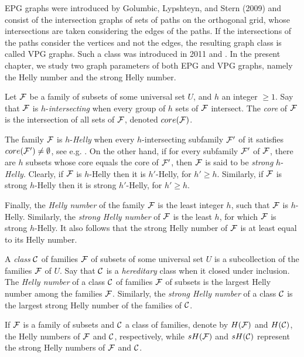 EPG graphs were introduced by Golumbic, Lypshteyn, and Stern (2009) and consist of the intersection graphs of sets of paths on the orthogonal grid, whose intersections are taken considering the edges of the paths. If the intersections of the paths consider the vertices and not the edges, the resulting graph class is called VPG graphs. Such a class was introduced in 2011 \cite{asinowski2011string} and \cite{asinowski2012}.  In the present chapter, we study two graph parameters of both EPG and VPG graphs, namely the Helly number and the strong Helly number.

Let $\cal {F}$ be a family of subsets of some universal set $U$, and $h$ an integer $\geq 1$.  Say that $\cal{F}$ is $h$-{\it intersecting} when every group of $h$ sets of $\cal {F}$ intersect. The {\it core} of $\cal {F}$ is the intersection of all sets of $\cal {F}$, denoted $core(\cal F)$. 

The family $\cal{F}$ is $h$-{\it Helly}  when every $h$-intersecting subfamily $\cal{F'}$ of it satisfies $core(\cal{F'}) \neq \emptyset$, see e.g. \cite{duchet1978propriete}. On the other hand, if for every subfamily $\cal{F'}$ of $\cal{F}$, there are $h$ subsets whose core equals the core of  $\cal {F'}$, then $\cal {F}$ is said to be {\it strong} $h$-{\it Helly}. Clearly, if $\cal {F}$ is $h$-Helly then it is $h'$-Helly, for $h' \geq h$. Similarly, 
 if ${\cal F}$ is strong $h$-Helly then it is strong $h'$-Helly, for $h' \geq h$. 

Finally, the  {\it Helly number} of the family $\cal{F}$ is the least integer $h$, such that $\cal{F}$ is $h$-Helly. Similarly, the {\it strong Helly number} of $\cal{F}$ is the least $h$, for which  $\cal{F}$ is strong $h$-Helly. It also follows that the strong Helly number of $\cal{F}$ is at least equal to its  Helly number.


A {\it class} $\cal {C}$ of families $\cal {F}$  of subsets of some universal set $U$ is a subcollection  of the families  $\cal {F}$ of $U$. Say that $\cal C$ is a {\it hereditary} class when it closed under inclusion. The {\it Helly number} of a class $\cal{C}$ of families $\cal{F}$ of subsets is the largest Helly number among the families $\cal {F}$. Similarly, the {\it strong Helly number} of a class $\cal {C}$ is the largest strong Helly number of the families of $\cal {C}$.

If $\cal F$ is a family of subsets and $\cal C$ a class of families, denote by $H(\cal F)$ and 
$H(\cal C)$,  the Helly numbers of $\cal F$ and $\cal C$, respectively, while  $sH({\cal F})$ and $sH({\cal C})$  represent the strong Helly numbers of $\cal F$ and $\cal C$.


